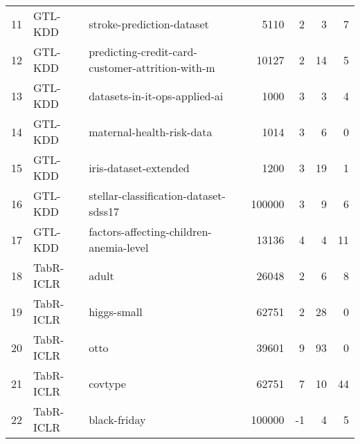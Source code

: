 \begin{table}[]
{\begin{tabular}{rllrrrr}
11                     & GTL-KDD    & stroke-prediction-dataset                        & 5110                    & 2                       & 3                       & 7                       \\
12                     & GTL-KDD    & predicting-credit-card-customer-attrition-with-m & 10127                   & 2                       & 14                      & 5                       \\
13                     & GTL-KDD    & datasets-in-it-ops-applied-ai                    & 1000                    & 3                       & 3                       & 4                       \\
14                     & GTL-KDD    & maternal-health-risk-data                        & 1014                    & 3                       & 6                       & 0                       \\
15                     & GTL-KDD    & iris-dataset-extended                            & 1200                    & 3                       & 19                      & 1                       \\
16                     & GTL-KDD    & stellar-classification-dataset-sdss17            & 100000                  & 3                       & 9                       & 6                       \\
17                     & GTL-KDD    & factors-affecting-children-anemia-level          & 13136                   & 4                       & 4                       & 11                      \\
\midrule
18                     & TabR-ICLR    & adult                                            & 26048                   & 2                       & 6                       & 8                       \\
19                     & TabR-ICLR    & higgs-small                                      & 62751                   & 2                       & 28                      & 0                       \\
20                     & TabR-ICLR    & otto                                             & 39601                   & 9                       & 93                      & 0                       \\
21                     & TabR-ICLR    & covtype                                          & 62751                   & 7                       & 10                      & 44                      \\
22                     & TabR-ICLR    & black-friday                                     & 100000                  & -1                      & 4                       & 5                       \\

\end{tabular}}
\end{table}

